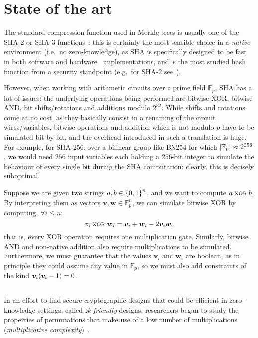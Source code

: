 \section{State of the art}\label{sec:sota}
The standard compression function used in Merkle trees is usually one of the SHA-2 or SHA-3 
functions~\cite{Dang2015}: this is certainly the most sensible choice in a \emph{native} 
environment (i.e.\ no zero-knowledge), as SHA is specifically designed to be fast in both software 
and hardware~\cite{DaddaMO2004,MichailAKTG2012} implementations, and is the most studied hash 
function from a security standpoint (e.g.\ for SHA-2 
see~\cite{KhovratovichRS2012,GuoLRW2010,DobraunigEM2016}).

However, when working with arithmetic circuits over a prime field \(\mathbb{F}_p\), SHA has a lot 
of issues: the underlying operations being performed are bitwise XOR, bitwise AND, 
bit shifts/rotations and additions modulo \(2^{32}\).
While shifts and rotations come at no cost, as they basically consist in a renaming of the circuit 
wires/variables, bitwise operations and addition which is not modulo \(p\) have to be simulated 
bit-by-bit, and the overhead introduced in such a translation is huge.
For example, for SHA-256, over a bilinear group like BN254 for which 
\(\left\lvert\mathbb{F}_p\right\rvert \approx 2^{256}\), we would need \(256\) input variables each holding a
\(256\)-bit integer to simulate the behaviour of every single bit during the SHA computation; 
clearly, this is decisely suboptimal.

\begin{example}
  Suppose we are given two strings \(a, b \in \left\{0, 1\right\}^{n}\), and we want to compute 
  \(a \mathbin{\textnormal{\textsc{xor}}} b\).
  By interpreting them as vectors \(\bm{v}, \bm{w} \in \mathbb{F}_{p}^{n}\), we can simulate 
  bitwise XOR by computing, \(\forall i \le n\):
  \[\bm{v}_{i} \mathbin{\textnormal{\textsc{xor}}} \bm{w}_{i} = \bm{v}_{i} + \bm{w}_{i} - 2\bm{v}_{i}\bm{w}_{i}\]
  that is, every XOR operation requires one multiplication gate.
  Similarly, bitwise AND and non-native addition also require multiplications to be simulated.
  Furthermore, we must guarantee that the values \(\bm{v}_i\) and \(\bm{w}_i\) are boolean, as 
  in principle they could assume any value in \(\mathbb{F}_p\), so we must also add constraints of 
  the kind \(\bm{v}_{i}\Parens*{\bm{v}_i - 1} = 0\).
\end{example}

\subsection{\Mimc}
In an effort to find secure cryptographic designs that could be efficient in zero-knowledge 
settings, called \emph{zk-friendly} designs, researchers began to study the properties of 
permutations that make use of a low number of multiplications 
(\emph{multiplicative complexity})~\cite{AlbrechtRSTZ2016}.

